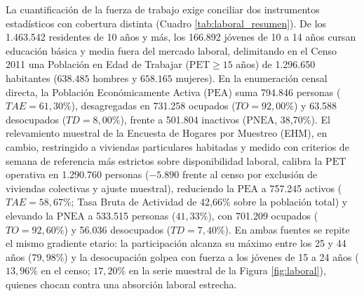 \documentclass[12pt,letterpaper]{article}
\begin{document}
La cuantificación de la fuerza de trabajo exige conciliar dos instrumentos estadísticos con cobertura distinta (Cuadro \ref{tab:laboral_resumen}). De los 1.463.542 residentes de 10 años y más, los 166.892 jóvenes de 10 a 14 años cursan educación básica y media fuera del mercado laboral, delimitando en el Censo 2011 una Población en Edad de Trabajar ($\text{PET} \ge 15$ años) de 1.296.650 habitantes ($638.485$ hombres y $658.165$ mujeres). En la enumeración censal directa, la Población Económicamente Activa ($\text{PEA}$) suma 794.846 personas ($TAE = 61,30\%$), desagregadas en 731.258 ocupados ($TO = 92,00\%$) y 63.588 desocupados ($TD = 8,00\%$), frente a 501.804 inactivos ($\text{PNEA}$, 38,70\%). El relevamiento muestral de la Encuesta de Hogares por Muestreo (EHM), en cambio, restringido a viviendas particulares habitadas y medido con criterios de semana de referencia más estrictos sobre disponibilidad laboral, calibra la $\text{PET}$ operativa en 1.290.760 personas ($-5.890$ frente al censo por exclusión de viviendas colectivas y ajuste muestral), reduciendo la $\text{PEA}$ a 757.245 activos ($TAE = 58,67\%$; Tasa Bruta de Actividad de 42,66\% sobre la población total) y elevando la $\text{PNEA}$ a 533.515 personas ($41,33\%$), con 701.209 ocupados ($TO = 92,60\%$) y 56.036 desocupados ($TD = 7,40\%$). En ambas fuentes se repite el mismo gradiente etario: la participación alcanza su máximo entre los 25 y 44 años ($79,98\%$) y la desocupación golpea con fuerza a los jóvenes de 15 a 24 años ($13,96\%$ en el censo; $17,20\%$ en la serie muestral de la Figura \ref{fig:laboral}), quienes chocan contra una absorción laboral estrecha.
\end{document}

